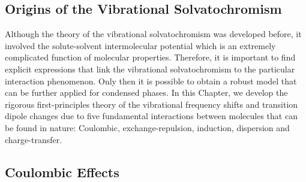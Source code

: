 \documentclass[a4paper,titlepage,twoside,fleqn,12pt]{book}
\begin{document}
\begin{refsection}
\chapter{Origins of the Vibrational Solvatochromism \label{c:my-model}}

Although the theory of the vibrational solvatochromism
was developed before, it involved the solute\hyp{}solvent
intermolecular potential which is an extremely complicated function
of molecular properties.
Therefore, it is important to find explicit 
expressions that link the vibrational solvatochromism
to the particular interaction phenomenon.
Only then it is possible to obtain a robust model
that can be further applied for condensed phases. 
In this Chapter, we develop the rigorous first\hyp{}principles
theory of the vibrational frequency shifts and transition
dipole changes due to five fundamental interactions
between molecules that can be found in nature: Coulombic, 
exchange\hyp{}repulsion, induction, dispersion and charge\hyp{}transfer.

\section{Coulombic Effects\label{s:dw-coul}}


\end{refsection}
\end{document}
